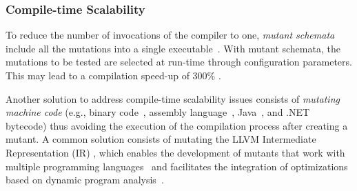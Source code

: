 %

\subsubsection{Compile-time Scalability}
\label{sec:compile:time}


To reduce the number of invocations of the compiler to one, \emph{mutant schemata} include all the mutations into a single executable~\cite{untch1993mutation}. 
With mutant schemata, the mutations to be tested are selected at run-time through configuration parameters. This may lead to a compilation speed-up of 300\% \cite{papadakis2010automatic}. 


Another solution to address compile-time scalability issues consists of \emph{mutating machine code}  (e.g., binary code~\cite{becker2012xemu}, assembly language~\cite{crouzet2006sesame},
Java~\cite{ma2006mujava}, 
 and
.NET~\cite{derezinska2011object} bytecode) thus avoiding the execution of the compilation process after creating a mutant. 
A common solution consists of mutating the
 LLVM Intermediate Representation (IR) \cite{hariri2016evaluating}, 
which enables the development of mutants that work with multiple programming languages~\cite{hariri2019comparing} and facilitates the integration of optimizations based on dynamic program analysis~\cite{denisov2018mull}.


